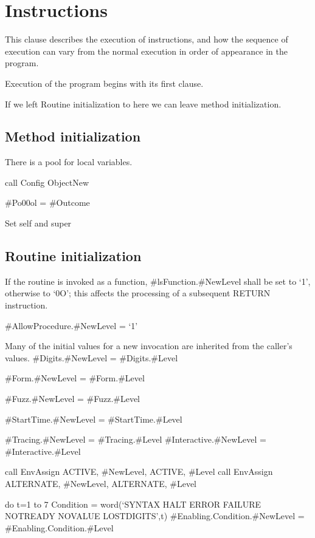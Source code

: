 \chapter{Instructions}\label{instructions}

This clause describes the execution of instructions, and how the
sequence of execution can vary from the normal execution in order of
appearance in the program.

Execution of the program begins with its first clause.

If we left Routine initialization to here we can leave method
initialization.

\section{Method initialization}\label{method-initialization}

There is a pool for local variables.

call Config ObjectNew

\#Po00ol = \#Outcome

Set self and super

\section{Routine initialization}\label{routine-initialization}

If the routine is invoked as a function, \#lsFunction.\#NewLevel shall
be set to `1', otherwise to `0O'; this affects the processing of a
subsequent RETURN instruction.

\#AllowProcedure.\#NewLevel = `1'

Many of the initial values for a new invocation are inherited from the
caller's values. \#Digits.\#NewLevel = \#Digits.\#Level

\#Form.\#NewLevel = \#Form.\#Level

\#Fuzz.\#NewLevel = \#Fuzz.\#Level

\#StartTime.\#NewLevel = \#StartTime.\#Level

\#Tracing.\#NewLevel = \#Tracing.\#Level \#Interactive.\#NewLevel =
\#Interactive.\#Level

call EnvAssign ACTIVE, \#NewLevel, ACTIVE, \#Level call EnvAssign
ALTERNATE, \#NewLevel, ALTERNATE, \#Level

do t=1 to 7 Condition = word(`SYNTAX HALT ERROR FAILURE NOTREADY NOVALUE
LOSTDIGITS',t) \#Enabling.Condition.\#NewLevel =
\#Enabling.Condition.\#Level

